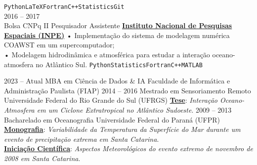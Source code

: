 \documentclass[9pt]{developercv} %
\begin{document}
\begin{entrylist}
{		%
        \texttt{Python}\slashsep\texttt{LaTeX}\slashsep\texttt{Fortran}\slashsep\texttt{C++}\slashsep\texttt{Statistics}\slashsep\texttt{Git}}
		\\\entry
		{2016 -- 2017\\\footnotesize{Bolsa CNPq II}}
		{Pesquisador Assistente}
		{\href{https://www.gov.br/inpe/pt-br}{\textcolor{bleu_cite}{\textbf{Instituto Nacional de Pesquisas Espaciais (INPE)}}}}
		{• Implementação do sistema de modelagem numérica COAWST em um supercomputador; \\
		 • Modelagem hidrodinâmica e atmosférica para estudar a interação oceano-atmosfera no Atlântico Sul. 
		 \texttt{Python}\slashsep\texttt{Statistics}\slashsep\texttt{Fortran}\slashsep\texttt{C++}\slashsep\texttt{MATLAB}}
\end{entrylist}

\vspace{-0.5cm}

\begin{entrylist}
	\entry
		{2023 -- Atual}
		{MBA em Ciência de Dados \& IA}
		{Faculdade de Informática e Administração Paulista (FIAP)}
		{}
		\entry
		{2014 -- 2016}
		{Mestrado em Sensoriamento Remoto}
		{Universidade Federal do Rio Grande do Sul (UFRGS)}
		{\href{https://lume.ufrgs.br/handle/10183/171223}{\textcolor{bleu_cite}{\textbf{Tese}}}: \textit{Interação Oceano-Atmosfera em um Ciclone Extratropical no Atlântico Sudoeste}.}
	\entry
		{2009 -- 2013}
		{Bacharelado em Oceanografia}
		{Universidade Federal do Paraná (UFPR)}
		{\href{http://doi.org/10.13140/RG.2.2.15184.35847}{\textcolor{bleu_cite}{\textbf{Monografia}}}: \textit{Variabilidade da Temperatura da Superfície do Mar durante um evento de precipitação extrema em Santa Catarina}. 
		\\ \href{http://doi.org/10.13140/RG.2.2.25250.68800}{\textcolor{bleu_cite}{\textbf{Iniciação Científica}}}: \textit{Aspectos Meteorológicos do evento extremo de novembro de 2008 em Santa Catarina}.
		}
\end{entrylist}

\vspace{-0.4cm}
\end{document}
